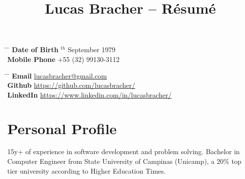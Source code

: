 \documentclass[10pt]{article} %
\begin{document}

\title{Lucas Bracher -- Résumé} %


\parbox{0.5\textwidth}{ %
\begin{tabbing} %
\hspace{3cm} \= \hspace{4cm} \= \kill %
{\bf Date of Birth} $^{th}$ September 1979 \\ %
{\bf Mobile Phone} \> +55 (32) 99130-3112 \\ %
\end{tabbing}}
\hfill %
\parbox{0.5\textwidth}{ %
\begin{tabbing} %
\hspace{3cm} \= \hspace{4cm} \= \kill %
{\bf Email} \> \href{mailto:lucasbracher@gmail.com}{lucasbracher@gmail.com} \\ %
{\bf Github} \> \href{https://github.com/lucasbracher/}{https://github.com/lucasbracher/} \\ %
{\bf LinkedIn} \> \href{https://www.linkedin.com/in/lucasbracher/}{https://www.linkedin.com/in/lucasbracher/} \\ %
\end{tabbing}}


\section{Personal Profile}

15y+ of experience in software development and problem solving. Bachelor in Computer Engineer from State University of Campinas (Unicamp), a 20\% top tier university according to Higher Education Times.

\end{document}
